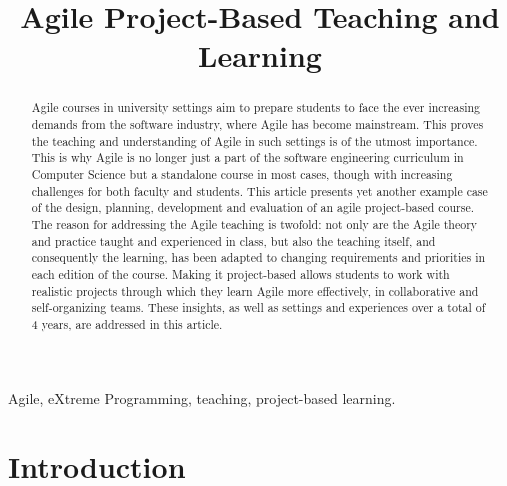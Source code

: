 \documentclass[conference]{IEEEtran}
\begin{document}
\title{Agile Project-Based Teaching and Learning}

\author{
\IEEEauthorblockA{Computer Science Dept.\\
Faculty of Cooperative Studies\\
Berlin School of Economics and Law, Germany\\
Dagmar.Monett-Diaz@hwr-berlin.de}}
\maketitle

\begin{abstract}
\boldmath
Agile courses in university settings aim to prepare students to face the ever increasing demands from the software industry, where Agile has become mainstream. This proves the teaching and understanding of Agile in such settings is of the utmost importance. This is why Agile is no longer just a part of the software engineering curriculum in Computer Science but a standalone course in most cases, though with increasing challenges for both faculty and students. This article presents yet another example case of the design, planning, development and evaluation of an agile project-based course. The reason for addressing the Agile teaching is twofold: not only are the Agile theory and practice taught and experienced in class, but also the teaching itself, and consequently the learning, has been adapted to changing requirements and priorities in each edition of the course. Making it project-based allows students to work with realistic projects through which they learn Agile more effectively, in collaborative and self-organizing teams. These insights, as well as settings and experiences over a total of 4 years, are addressed in this article.
\end{abstract}

\begin{keywords}
Agile, eXtreme Programming, teaching, project-based learning.
\end{keywords}

\section{Introduction}
\label{sec:intro}
\end{document}
